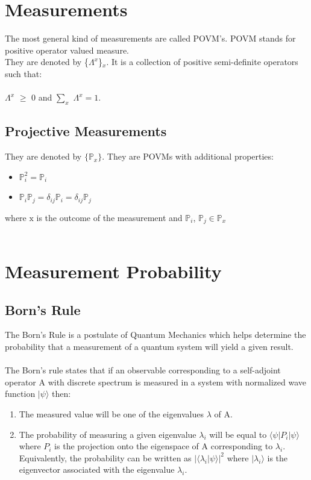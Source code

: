 \documentclass{article}
\begin{document}
\section{Measurements}
The most general kind of measurements are called POVM’s. POVM stands for positive operator valued measure. \\
They are denoted by \{$\Lambda^{x}$\}$_{x}$. It is a collection of positive semi-definite operators such that: \\ \\
{$\Lambda^{x}$} $\ge$ 0 and $\sum\limits_{x}$ {$\Lambda^{x} = 1$}. \\

\subsection{Projective Measurements}
They are denoted by $\{\mathbb{P}_{x}\}$. They are POVMs with additional properties:
\begin{itemize}
	\item $\mathbb{P}_{i}^{2} = \mathbb{P}_{i}$
\end{itemize}
\begin{itemize}
	\item $\mathbb{P}_{i} \mathbb{P}_{j}  = \delta_{ij} \mathbb{P}_{i} = \delta_{ij} \mathbb{P}_{j}$
\end{itemize}
where $\mathrm{x}$ is the outcome of the measurement and $\mathbb{P}_{i}$, $\mathbb{P}_{j} \in \mathbb{P}_{x}$ \\ \\

\section{Measurement Probability}
\subsection{Born's Rule}
The Born's Rule is a postulate of Quantum Mechanics which helps determine the probability that a measurement of a quantum system will yield a given result. \\ \\
The Born's rule states that if an observable corresponding to a self-adjoint operator A with discrete spectrum is measured in a system with normalized wave function
$|\psi \rangle$ then:

\begin{enumerate}
\item The measured value will be one of the eigenvalues $\lambda$ of A.
\item The probability of measuring a given eigenvalue $\lambda_{i}$ will be equal to
${\displaystyle \langle {\psi} |P_{i}| {\psi} \rangle }$ where $P_{i}$ is the projection onto the eigenspace of A corresponding to $\lambda_{i}$.
Equivalently, the probability can be written as $|\langle \lambda _{i}|\psi \rangle |^{2}$
where $|\lambda_{i} \rangle$  is the eigenvector associated with the eigenvalue $\lambda_{i}$.
\end{enumerate}
\end{document}
